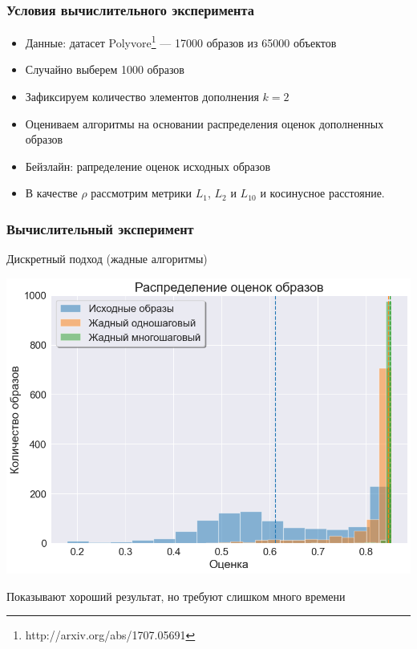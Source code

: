 \documentclass[10pt]{beamer}
\begin{document}
\begin{frame}
	\frametitle{Условия вычислительного эксперимента}
		\begin{itemize}
			\item Данные: датасет Polyvore\footnote{http://arxiv.org/abs/1707.05691} --- 17000 образов из 65000 объектов
			\item Случайно выберем 1000 образов 
			\item Зафиксируем количество элементов дополнения $k=2$
			\item Оцениваем алгоритмы на основании распределения оценок дополненных образов
			\item Бейзлайн: рапределение оценок исходных образов
			\item В качестве $\rho$ рассмотрим метрики $L_1$, $L_2$ и $L_{10}$ и косинусное расстояние.
		\end{itemize}
\end{frame}


\begin{frame}
	\frametitle{Вычислительный эксперимент}
	\begin{block}{Дискретный подход (жадные алгоритмы)}
		\vspace{-0.3cm}
		\begin{center}
		\includegraphics[scale = 0.47]{../figures/greedy_at_least_5_subset1000.png}
		\end{center}
		
		Показывают хороший результат, но требуют слишком много времени
	\end{block}
\end{frame}
\end{document}
